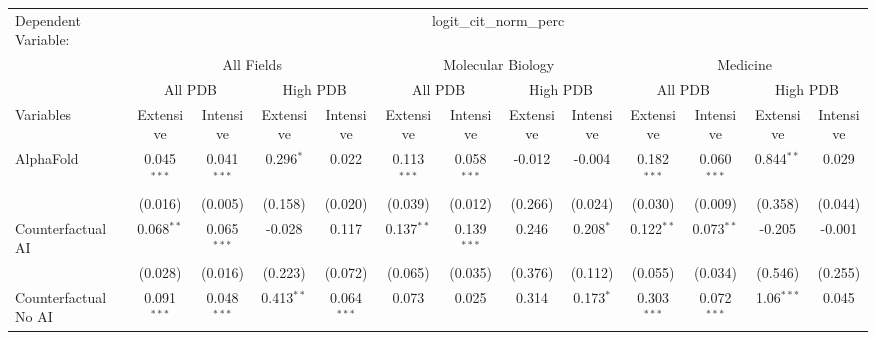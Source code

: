 \begingroup
\centering
\begin{tabular}{lcccccccccccc}
   \tabularnewline \midrule \midrule
   Dependent Variable: & \multicolumn{12}{c}{logit\_cit\_norm\_perc}\\
 & \multicolumn{4}{c}{All Fields} & \multicolumn{4}{c}{Molecular Biology} & \multicolumn{4}{c}{Medicine} \\
\cmidrule(lr){2-5} \cmidrule(lr){6-9} \cmidrule(lr){10-13}
 & \multicolumn{2}{c}{All PDB} & \multicolumn{2}{c}{High PDB} & \multicolumn{2}{c}{All PDB} & \multicolumn{2}{c}{High PDB} & \multicolumn{2}{c}{All PDB} & \multicolumn{2}{c}{High PDB} \\
\cmidrule(lr){2-3} \cmidrule(lr){4-5} \cmidrule(lr){6-7} \cmidrule(lr){8-9} \cmidrule(lr){10-11} \cmidrule(lr){12-13}
Variables & \multicolumn{1}{c}{Extensive} & \multicolumn{1}{c}{Intensive} & \multicolumn{1}{c}{Extensive} & \multicolumn{1}{c}{Intensive} & \multicolumn{1}{c}{Extensive} & \multicolumn{1}{c}{Intensive} & \multicolumn{1}{c}{Extensive} & \multicolumn{1}{c}{Intensive} & \multicolumn{1}{c}{Extensive} & \multicolumn{1}{c}{Intensive} & \multicolumn{1}{c}{Extensive} & \multicolumn{1}{c}{Intensive} \\
\cmidrule(lr){1-1}\cmidrule(lr){2-2} \cmidrule(lr){3-3} \cmidrule(lr){4-4} \cmidrule(lr){5-5} \cmidrule(lr){6-6} \cmidrule(lr){7-7} \cmidrule(lr){8-8} \cmidrule(lr){9-9} \cmidrule(lr){10-10} \cmidrule(lr){11-11} \cmidrule(lr){12-12} \cmidrule(lr){13-13}
   AlphaFold                                & 0.045$^{***}$ & 0.041$^{***}$  & 0.296$^{*}$  & 0.022          & 0.113$^{***}$ & 0.058$^{***}$  & -0.012  & -0.004        & 0.182$^{***}$ & 0.060$^{***}$  & 0.844$^{**}$ & 0.029\\   
                                            & (0.016)       & (0.005)        & (0.158)      & (0.020)        & (0.039)       & (0.012)        & (0.266) & (0.024)       & (0.030)       & (0.009)        & (0.358)      & (0.044)\\   
   Counterfactual AI                        & 0.068$^{**}$  & 0.065$^{***}$  & -0.028       & 0.117          & 0.137$^{**}$  & 0.139$^{***}$  & 0.246   & 0.208$^{*}$   & 0.122$^{**}$  & 0.073$^{**}$   & -0.205       & -0.001\\   
                                            & (0.028)       & (0.016)        & (0.223)      & (0.072)        & (0.065)       & (0.035)        & (0.376) & (0.112)       & (0.055)       & (0.034)        & (0.546)      & (0.255)\\   
   Counterfactual No AI                     & 0.091$^{***}$ & 0.048$^{***}$  & 0.413$^{**}$ & 0.064$^{***}$  & 0.073         & 0.025          & 0.314   & 0.173$^{*}$   & 0.303$^{***}$ & 0.072$^{***}$  & 1.06$^{***}$ & 0.045\\   

\end{tabular}
